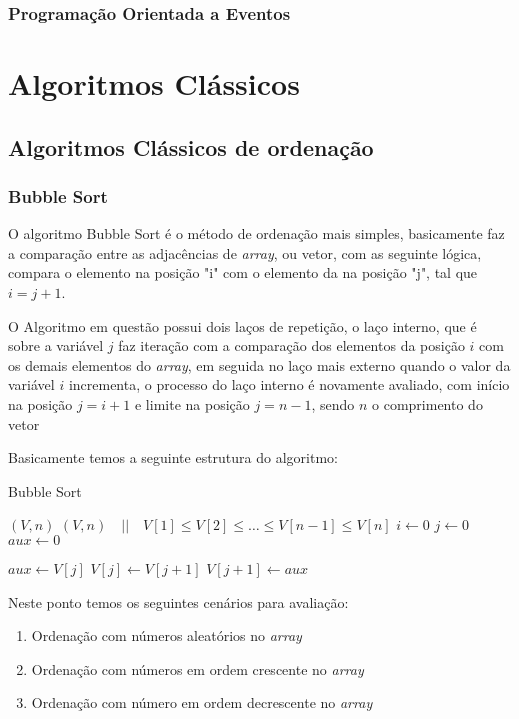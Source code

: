 \documentclass[tcc/ec]{faeng}
\begin{document}
\subsection{Programação Orientada a Eventos}

\chapter[Algoritmos clássicos de computação]{Algoritmos Clássicos}

\section{Algoritmos Clássicos de ordenação}

\subsection{Bubble Sort}
O algoritmo Bubble Sort é o método de ordenação mais simples, basicamente faz a comparação entre as adjacências de \textit{array}, ou vetor, com as seguinte lógica, compara o elemento na posição "i" com o elemento da na posição "j", tal que $ i = j+1$.

O Algoritmo em questão possui dois laços de repetição, o laço interno, que é sobre a variável $j$ faz iteração com a comparação dos elementos da posição $i$ com os demais elementos do \textit{array}, em seguida no laço mais externo quando o valor da variável $i$ incrementa, o processo do laço interno é novamente avaliado, com início na posição $j = i+1$ e limite na posição $j = n - 1$, sendo $n$ o comprimento do vetor

Basicamente temos a seguinte estrutura do algoritmo:

\begin{algorithm}
\caption{Bubble Sort}
\begin{algorithmic}
\REQUIRE $(V,n)$
\ENSURE $(V,n) \quad ||  \quad V[1] \leq V[2] \leq \ldots \leq V[n-1] \leq V[n]$
\STATE $i \gets 0$
\STATE $j \gets 0$
\STATE $aux \gets 0$

            \STATE $aux \gets V[j]$
            \STATE $V[j] \gets V[j+1]$
            \STATE $V[j+1] \gets aux$
        \ENDIF
    \ENDFOR
\ENDFOR 
\end{algorithmic}
\end{algorithm}

Neste ponto temos os seguintes cenários para avaliação:
\begin{enumerate}
    \item Ordenação com números aleatórios no \textit{array}
    \item Ordenação com números em ordem crescente no  \textit{array}
    \item Ordenação com número em ordem decrescente no \textit{array}
\end{enumerate}
\end{document}
